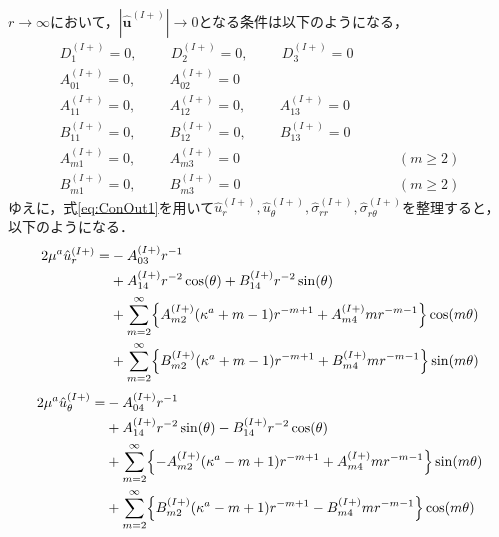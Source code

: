 $r\rightarrow\infty$において，$|\hat{\bm{u}}^{(I+)}|\rightarrow0$となる条件は以下のようになる，
\begin{align}
D_{1}^{(I+)}=0,\hspace{1cm}
D_{2}^{(I+)}=0,\hspace{1cm}
D_{3}^{(I+)}=0&
\nonumber
\\
A_{01}^{(I+)}=0,\hspace{1cm}A_{02}^{(I+)}=0&
\nonumber
\\
A_{11}^{(I+)}=0,\hspace{1cm}A_{12}^{(I+)}=0,\hspace{1cm}A_{13}^{(I+)}=0&
\nonumber
\\
B_{11}^{(I+)}=0,\hspace{1cm}B_{12}^{(I+)}=0,\hspace{1cm}B_{13}^{(I+)}=0&
\nonumber
\\
A_{m1}^{(I+)}=0,\hspace{1cm}A_{m3}^{(I+)}=0&\hspace{1cm}(m\geq2)
\nonumber
\\
B_{m1}^{(I+)}=0,\hspace{1cm}B_{m3}^{(I+)}=0&\hspace{1cm}(m\geq2)
\label{eq:ConOut1}
\end{align}
ゆえに，式\eqref{eq:ConOut1}を用いて$\hat{u}_{r}^{(I+)},\hat{u}_{\theta}^{(I+)},\hat{\sigma}_{rr}^{(I+)},\hat{\sigma}_{r\theta}^{(I+)}$を整理すると，以下のようになる．
\begin{align}
	2\mu^{a}\hat{u}_{r}^{(I+)} =&-A_{03}^{(I+)}r^{-1}
	\nonumber
	\\
	&+A_{14}^{(I+)}r^{-2}\cos(\theta)
	+B_{14}^{(I+)}r^{-2}\sin(\theta)
	\nonumber
	\\
	&+\sum_{m=2}^{\infty}\Bigl\{A_{m2}^{(I+)}(\kappa^{a}+m-1)r^{-m+1}
	+A_{m4}^{(I+)}mr^{-m-1}\Bigr\}\cos(m\theta)
	\nonumber
	\\
	&+\sum_{m=2}^{\infty}\Bigl\{B_{m2}^{(I+)}(\kappa^{a}+m-1)r^{-m+1}
	+B_{m4}^{(I+)}mr^{-m-1}\Bigr\}\sin(m\theta)
	\label{eq:UROut1}
\end{align}
\begin{align}
	2\mu^{a}\hat{u}_{\theta}^{(I+)} =&-A_{04}^{(I+)}r^{-1}
	\nonumber
	\\
	&+A_{14}^{(I+)}r^{-2}\sin(\theta)
	-B_{14}^{(I+)}r^{-2}\cos(\theta)
	\nonumber
	\\
	&+\sum_{m=2}^{\infty}\Bigl\{-A_{m2}^{(I+)}(\kappa^{a}-m+1)r^{-m+1}
	+A_{m4}^{(I+)}mr^{-m-1}\Bigr\}\sin(m\theta)
	\nonumber
	\\
	&+\sum_{m=2}^{\infty}\Bigl\{B_{m2}^{(I+)}(\kappa^{a}-m+1)r^{-m+1}
	-B_{m4}^{(I+)}mr^{-m-1}\Bigr\}\cos(m\theta)
	\label{eq:UThOut1}
\end{align}
